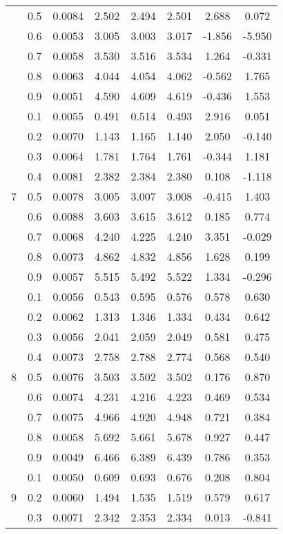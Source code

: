 \documentclass[11pt,a4paper]{report}
\begin{document}
\begin{longtable}{ | c | c || c | c | c | c | c | c | }
 & 0.5 & 0.0084 & 2.502 & 2.494 & 2.501 & 2.688 & 0.072 \\
 & 0.6 & 0.0053 & 3.005 & 3.003 & 3.017 & -1.856 & -5.950 \\
 & 0.7 & 0.0058 & 3.530 & 3.516 & 3.534 & 1.264 & -0.331 \\
 & 0.8 & 0.0063 & 4.044 & 4.054 & 4.062 & -0.562 & 1.765 \\
 & 0.9 & 0.0051 & 4.590 & 4.609 & 4.619 & -0.436 & 1.553 \\
 \hline
\multirow{9}{*}{7} & 0.1 & 0.0055 & 0.491 & 0.514 & 0.493 & 2.916 & 0.051 \\
 & 0.2 & 0.0070 & 1.143 & 1.165 & 1.140 & 2.050 & -0.140 \\
 & 0.3 & 0.0064 & 1.781 & 1.764 & 1.761 & -0.344 & 1.181 \\
 & 0.4 & 0.0081 & 2.382 & 2.384 & 2.380 & 0.108 & -1.118 \\
 & 0.5 & 0.0078 & 3.005 & 3.007 & 3.008 & -0.415 & 1.403 \\
 & 0.6 & 0.0088 & 3.603 & 3.615 & 3.612 & 0.185 & 0.774 \\
 & 0.7 & 0.0068 & 4.240 & 4.225 & 4.240 & 3.351 & -0.029 \\
 & 0.8 & 0.0073 & 4.862 & 4.832 & 4.856 & 1.628 & 0.199 \\
 & 0.9 & 0.0057 & 5.515 & 5.492 & 5.522 & 1.334 & -0.296 \\
 \hline
\multirow{9}{*}{8} & 0.1 & 0.0056 & 0.543 & 0.595 & 0.576 & 0.578 & 0.630 \\
 & 0.2 & 0.0062 & 1.313 & 1.346 & 1.334 & 0.434 & 0.642 \\
 & 0.3 & 0.0056 & 2.041 & 2.059 & 2.049 & 0.581 & 0.475 \\
 & 0.4 & 0.0073 & 2.758 & 2.788 & 2.774 & 0.568 & 0.540 \\
 & 0.5 & 0.0076 & 3.503 & 3.502 & 3.502 & 0.176 & 0.870 \\
 & 0.6 & 0.0074 & 4.231 & 4.216 & 4.223 & 0.469 & 0.534 \\
 & 0.7 & 0.0075 & 4.966 & 4.920 & 4.948 & 0.721 & 0.384 \\
 & 0.8 & 0.0058 & 5.692 & 5.661 & 5.678 & 0.927 & 0.447 \\
 & 0.9 & 0.0049 & 6.466 & 6.389 & 6.439 & 0.786 & 0.353 \\
 \hline
\multirow{9}{*}{9} & 0.1 & 0.0050 & 0.609 & 0.693 & 0.676 & 0.208 & 0.804 \\
 & 0.2 & 0.0060 & 1.494 & 1.535 & 1.519 & 0.579 & 0.617 \\
 & 0.3 & 0.0071 & 2.342 & 2.353 & 2.334 & 0.013 & -0.841 \\

\end{longtable}
\end{document}
